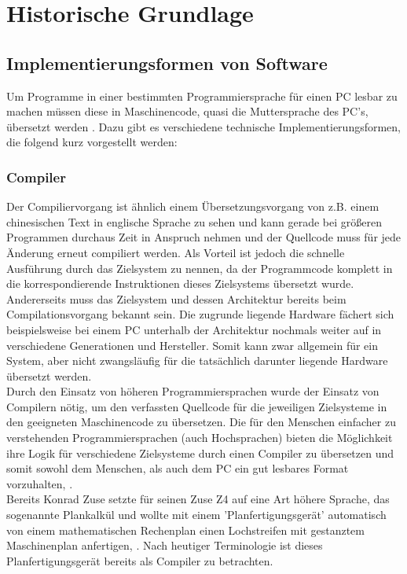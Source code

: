 \chapter{Historische Grundlage} %
\section{Implementierungsformen von Software}
Um Programme in einer bestimmten Programmiersprache für einen \ac{PC} lesbar zu machen müssen diese in Maschinencode, quasi die Muttersprache des \ac{PC}'s, übersetzt werden \cite[vgl. Wagenknecht Hielscher 2022, S.2ff]{wagenknecht_hielscher_2022}. Dazu gibt es verschiedene technische Implementierungsformen, die folgend kurz vorgestellt werden:

\subsection{Compiler}\label{ch_compiler}
Der Compiliervorgang ist ähnlich einem Übersetzungsvorgang von z.B. einem chinesischen Text in englische Sprache zu  sehen und kann gerade bei größeren Programmen durchaus Zeit in Anspruch nehmen und der Quellcode muss für jede Änderung erneut compiliert werden. Als Vorteil ist jedoch die schnelle Ausführung durch das Zielsystem zu nennen, da der Programmcode komplett in die korrespondierende Instruktionen dieses Zielsystems übersetzt wurde. \cite[vgl. Wagenknecht Hielscher, S.121]{wagenknecht_hielscher_2022}
Andererseits muss das Zielsystem und dessen Architektur bereits beim Compilationsvorgang bekannt sein. Die zugrunde liegende Hardware fächert sich beispielsweise bei einem \ac{PC} unterhalb der Architektur nochmals weiter auf in verschiedene Generationen und Hersteller. Somit kann zwar allgemein für ein System, aber nicht zwangsläufig für die tatsächlich darunter liegende Hardware übersetzt werden. \\
Durch den Einsatz von höheren Programmiersprachen wurde der Einsatz von Compilern nötig, um den verfassten Quellcode für die jeweiligen Zielsysteme in den geeigneten Maschinencode zu übersetzen. Die für den Menschen einfacher zu verstehenden Programmiersprachen (auch Hochsprachen) bieten die Möglichkeit ihre Logik für verschiedene Zielsysteme durch einen Compiler zu übersetzen und somit sowohl dem Menschen, als auch dem \ac{PC} ein gut lesbares Format vorzuhalten, \cite[vgl. Wagenknecht Hielscher, S.1ff]{wagenknecht_hielscher_2022}.\\
Bereits Konrad Zuse setzte für seinen Zuse Z4 auf eine Art höhere Sprache, das sogenannte Plankalkül und wollte mit einem 'Planfertigungsgerät' automatisch von einem mathematischen Rechenplan einen Lochstreifen mit gestanztem Maschinenplan anfertigen, \cite[vgl. Heilige 2013, S.45]{Hellige2013}. Nach heutiger Terminologie ist dieses Planfertigungsgerät bereits als Compiler zu betrachten. \\
